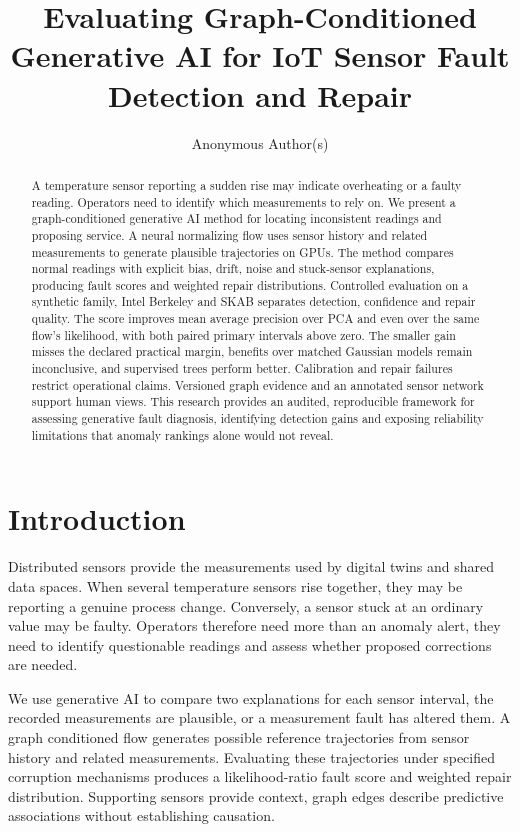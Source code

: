 \documentclass{llncs}
\title{Evaluating Graph-Conditioned Generative AI for IoT Sensor Fault Detection and Repair}
\author{Anonymous Author(s)}
\institute{}
\newcommand{\1}{\mathbf{1}}
\begin{document}
\maketitle
\begin{abstract}
A temperature sensor reporting a sudden rise may indicate overheating or a faulty reading. Operators need to identify which measurements to rely on. We present a graph-conditioned generative AI method for locating inconsistent readings and proposing service. A neural normalizing flow uses sensor history and related measurements to generate plausible trajectories on GPUs. The method compares normal readings with explicit bias, drift, noise and stuck-sensor explanations, producing fault scores and weighted repair distributions. Controlled evaluation on a synthetic family, Intel Berkeley and SKAB separates detection, confidence and repair quality. The score improves mean average precision over PCA and even over the same flow's likelihood, with both paired primary intervals above zero. The smaller gain misses the declared practical margin, benefits over matched Gaussian models remain inconclusive, and supervised trees perform better. Calibration and repair failures restrict operational claims. Versioned graph evidence and an annotated sensor network support human views. This research provides an audited, reproducible framework for assessing generative fault diagnosis, identifying detection gains and exposing reliability limitations that anomaly rankings alone would not reveal.
\end{abstract}



\section{Introduction}
Distributed sensors provide the measurements used by digital twins and shared data spaces. When several temperature sensors rise together, they may be reporting a genuine process change. Conversely, a sensor stuck at an ordinary value may be faulty. Operators therefore need more than an anomaly alert, they need to identify questionable readings and assess whether proposed corrections are needed.

We use generative AI to compare two explanations for each sensor interval, the recorded measurements are plausible, or a measurement fault has altered them. A graph conditioned flow generates possible reference trajectories from sensor history and related measurements. Evaluating these trajectories under specified corruption mechanisms produces a likelihood-ratio fault score and weighted repair distribution. Supporting sensors provide context, graph edges describe predictive associations without establishing causation.
\end{document}
